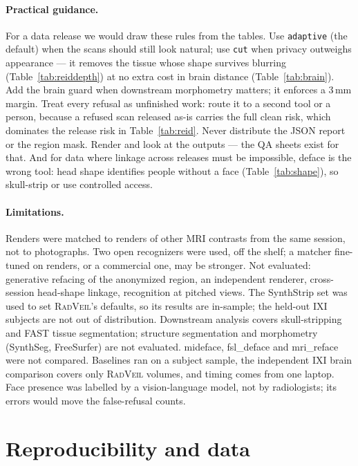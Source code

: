 \documentclass[11pt]{article}
\newcommand{\rv}{\textsc{RadVeil}}
\newcommand{\code}[1]{\texttt{#1}}
\begin{document}
\paragraph{Practical guidance.} For a data release we would draw these
rules from the tables. Use \code{adaptive} (the default) when the scans
should still look natural; use \code{cut} when privacy outweighs
appearance --- it removes the tissue whose shape survives blurring
(Table~\ref{tab:reiddepth}) at no extra cost in brain distance
(Table~\ref{tab:brain}). Add the brain guard when downstream morphometry
matters; it enforces a 3\,mm margin. Treat every refusal as unfinished
work: route it to a second tool or a person, because a refused scan
released as-is carries the full clean risk, which dominates the release
risk in Table~\ref{tab:reid}. Never distribute the JSON report or the
region mask. Render and look at the outputs --- the QA sheets exist for
that. And for data where linkage across releases must be impossible,
deface is the wrong tool: head shape identifies people without a face
(Table~\ref{tab:shape}), so skull-strip or use controlled access.

\paragraph{Limitations.}
\label{sec:limits}
Renders were matched to renders of other MRI contrasts from the same
session, not to photographs. Two open recognizers were used, off the shelf;
a matcher fine-tuned on renders, or a commercial one, may be stronger. Not
evaluated: generative refacing of the anonymized region, an independent
renderer, cross-session head-shape linkage, recognition at pitched views.
The SynthStrip set was used to set \rv{}'s defaults, so its results are
in-sample; the held-out IXI subjects are not out of distribution. Downstream
analysis covers skull-stripping and FAST tissue segmentation; structure
segmentation and morphometry (SynthSeg, FreeSurfer) are not evaluated.
mideface, fsl\_deface and mri\_reface were not compared. Baselines ran on a
subject sample, the independent IXI brain comparison covers only
\ixiRefAdaptiveN{} \rv{} volumes, and timing comes from one laptop. Face presence was labelled by a
vision-language model, not by radiologists; its errors would move the
false-refusal counts.

\section{Reproducibility and data}
\label{sec:repro}
\end{document}
